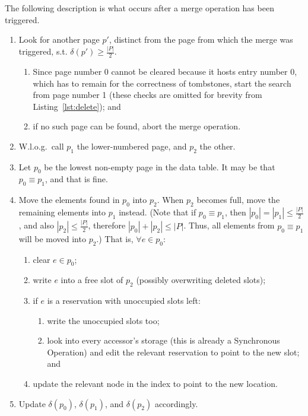 The following description is what occurs after a merge operation has been triggered.
\begin{enumerate}
	\item Look for another page $p'$, distinct from the page from which the merge was triggered, s.t. $\delta(p') \geq \frac{|P|}{2}$.
	\begin{enumerate}
		\item Since page number 0 cannot be cleared because it hosts entry number 0, which has to remain for the correctness of tombstones, start the search from page number 1 (these checks are omitted for brevity from Listing~\ref{lst:delete}); and
		\item if no such page can be found, abort the merge operation.
	\end{enumerate}
	\item W.l.o.g.\ call $p_1$ the lower-numbered page, and $p_2$ the other.
	\item Let $p_0$ be the lowest non-empty page in the data table.
	It may be that $p_0 \equiv p_1$, and that is fine.
	\item Move the elements found in $p_0$ into $p_2$.
	When $p_2$ becomes full, move the remaining elements into $p_1$ instead.
	(Note that if $p_0 \equiv p_1$, then $|p_0| = |p_1| \leq \frac{|P|}{2}$, and also $|p_2| \leq \frac{|P|}{2}$, therefore $|p_0| + |p_2| \leq |P|$.
	Thus, all elements from $p_0 \equiv p_1$ will be moved into $p_2$.)
	That is, $\forall e \in p_0$:
	\begin{enumerate}
		\item clear $e \in p_0$;
		\item write $e$ into a free slot of $p_2$ (possibly overwriting deleted slots);
		\item if $e$ is a reservation with unoccupied slots left:
		\begin{enumerate}
			\item write the unoccupied slots too;
			\item look into every accessor's storage (this is already a Synchronous Operation) and edit the relevant reservation to point to the new slot; and
		\end{enumerate}
		\item update the relevant node in the index to point to the new location.
	\end{enumerate}
	\item Update $\delta(p_0)$, $\delta(p_1)$, and $\delta(p_2)$ accordingly.
\end{enumerate}


